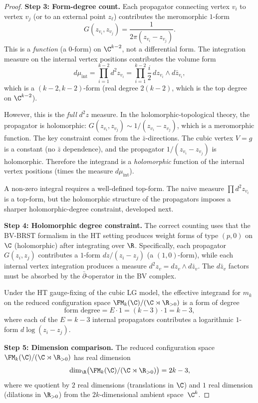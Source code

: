 \begin{proof}
\textbf{Step 3: Form-degree count.}
Each propagator connecting vertex $v_i$ to vertex $v_j$ (or to an external point $z_\ell$) contributes the meromorphic $1$-form
\[
G(z_{v_i}, z_{v_j}) = \frac{1}{2\pi(z_{v_i} - z_{v_j})}.
\]
This is a \emph{function} (a $0$-form) on $\C^{k-2}$, not a differential form. The integration measure on the internal vertex positions contributes the volume form
\[
d\mu_{\text{int}} = \prod_{i=1}^{k-2} d^2 z_{v_i} = \prod_{i=1}^{k-2} \frac{i}{2}\, dz_{v_i} \wedge d\bar{z}_{v_i},
\]
which is a $(k-2, k-2)$-form (real degree $2(k-2)$, which is the top degree on $\C^{k-2}$).

However, this is the \emph{full} $d^2z$ measure. In the holomorphic-topological theory, the propagator is holomorphic: $G(z_{v_i}, z_{v_j}) \sim 1/(z_{v_i} - z_{v_j})$, which is a meromorphic function. The key constraint comes from the $\bar{z}$-directions. The cubic vertex $V = g$ is a constant (no $\bar{z}$ dependence), and the propagator $1/(z_{v_i} - z_{v_j})$ is holomorphic. Therefore the integrand is a \emph{holomorphic} function of the internal vertex positions (times the measure $d\mu_{\text{int}}$).

A non-zero integral requires a well-defined top-form. The naive measure $\prod d^2z_{v_i}$ is a top-form, but the holomorphic structure of the propagators imposes a sharper holomorphic-degree constraint, developed next.

\textbf{Step 4: Holomorphic degree constraint.}
The correct counting uses that the BV-BRST formalism in the HT setting produces weight forms of type $(p,0)$ on $\C$ (holomorphic) after integrating over $\R$. Specifically, each propagator $G(z_i, z_j)$ contributes a $1$-form $dz/(z_i - z_j)$ (a $(1,0)$-form), while each internal vertex integration produces a measure $d^2z_v = dz_v \wedge d\bar{z}_v$. The $d\bar{z}_v$ factors must be absorbed by the $\bar{\partial}$-operator in the BV complex.

Under the HT gauge-fixing of the cubic LG model,
the effective integrand for $m_k$ on the reduced configuration space
$\FM_k(\C)/(\C \rtimes \R_{>0})$ is a form of degree
\[
\text{form degree} = E \cdot 1 = (k-3) \cdot 1 = k - 3,
\]
where each of the $E = k-3$ internal propagators contributes a logarithmic $1$-form $d\log(z_i - z_j)$.

\textbf{Step 5: Dimension comparison.}
The reduced configuration space $\FM_k(\C)/(\C \rtimes \R_{>0})$ has real dimension
\[
\dim_{\R}\bigl(\FM_k(\C)/(\C \rtimes \R_{>0})\bigr) = 2k - 3,
\]
where we quotient by $2$ real dimensions (translations in $\C$) and $1$ real dimension (dilations in $\R_{>0}$) from the $2k$-dimensional ambient space~$\C^k$.


\end{proof}
